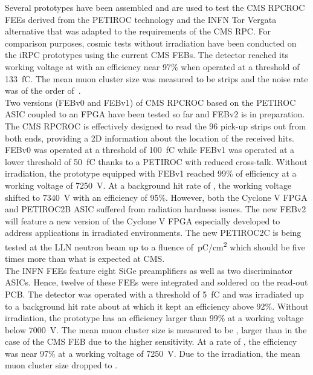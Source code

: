 	Several prototypes have been assembled and are used to test the CMS RPCROC FEEs derived from the PETIROC technology and the INFN Tor Vergata alternative that was adapted to the requirements of the CMS RPC. For comparison purposes, cosmic tests without irradiation have been conducted on the iRPC prototypes using the current CMS FEBs. The detector reached its working voltage at  with an efficiency near 97\% when operated at a threshold of \SI{133}{fC}. The mean muon cluster size was measured to be  strips and the noise rate was of the order of \,\sirate.\\
	Two versions (FEBv0 and FEBv1) of CMS RPCROC based on the PETIROC ASIC coupled to an FPGA have been tested so far and FEBv2 is in preparation. The CMS RPCROC is effectively designed to read the 96 pick-up strips out from both ends, providing a 2D information about the location of the received hits. FEBv0 was operated at a threshold of \SI{100}{fC} while FEBv1 was operated at a lower threshold of \SI{50}{fC} thanks to a PETIROC with reduced cross-talk. Without irradiation, the prototype equipped with FEBv1 reached 99\% of efficiency at a working voltage of \SI{7250}{V}. At a background hit rate of , the working voltage shifted to \SI{7340}{V} with an efficiency of 95\%. However, both the Cyclone V FPGA and PETIROC2B ASIC suffered from radiation hardness issues. The new FEBv2 will feature a new version of the Cyclone V FPGA especially developed to address applications in irradiated environments. The new PETIROC2C is being tested at the \acf{LLN} neutron beam up to a fluence of \,\si{pC/cm^2} which should be five times more than what is expected at CMS.\\
	The INFN FEEs feature eight SiGe preamplifiers as well as two discriminator ASICs. Hence, twelve of these FEEs were integrated and soldered on the read-out PCB. The detector was operated with a threshold of \SI{5}{fC} and was irradiated up to a background hit rate about  at which it kept an efficiency above 92\%. Without irradiation, the prototype has an efficiency larger than 99\% at a working voltage below \SI{7000}{V}. The mean muon cluster size is measured to be , larger than in the case of the CMS FEB due to the higher sensitivity. At a rate of , the efficiency was near 97\% at a working voltage of \SI{7250}{V}. Due to the irradiation, the mean muon cluster size dropped to .\vspace{5mm}
	
